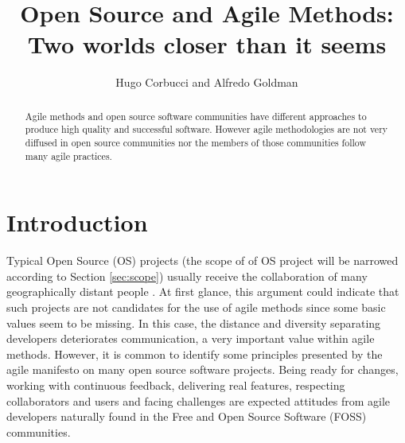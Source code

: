 \documentclass[lnbip]{svmultln}
\begin{document}
\mainmatter

\title{Open Source and Agile Methods:\\Two worlds closer than it
  seems}


\author{Hugo Corbucci and Alfredo Goldman}



 
\maketitle

\begin{abstract}
  Agile methods and open source software communities have different
  approaches to produce high quality and successful software. However
  agile methodologies are not very diffused in open source communities
  nor the members of those communities follow many agile
  practices.


\end{abstract}

\section{Introduction}

Typical Open Source (OS) projects (the scope of of OS project will be
narrowed according to Section \ref{sec:scope}) usually receive
the collaboration of many geographically distant people
\cite{report:dempsey1999}. At first glance, this argument could
indicate that such projects are not candidates for the use of agile
methods since some basic values seem to be missing. In this case, the
distance and diversity separating developers deteriorates
communication, a very important value within agile methods. However,
it is common to identify some principles presented by the agile
manifesto \cite{url:agilemanifesto} on many open source software
projects. Being ready for changes, working with continuous feedback,
delivering real features, respecting collaborators and users and
facing challenges are expected attitudes from agile developers
naturally found in the Free and Open Source Software (FOSS)
communities\cite{gabriel2005}.
\end{document}

